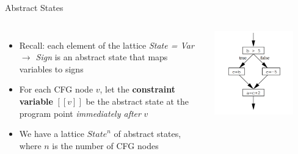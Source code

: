 \documentclass[aspectratio=169,xcolor=dvipsnames]{beamer}
\begin{document}

\begin{frame}[fragile]{Abstract States}
	\begin{columns}[c] %


		\begin{itemize}
			\item Recall: each element of the lattice {\it State = Var $\rightarrow$ Sign} is an
			      abstract state that maps variables to signs
			\item For each CFG node $v$, let the {\bf constraint variable} $[[v]]$ be the abstract state at the program point {\it
					      immediately after} $v$
			\item We have a lattice $\textit{State}^{n}$ of abstract states, where $n$ is the
			      number of CFG nodes
		\end{itemize}

		\includegraphics[width=0.8\textwidth]{img/2.png}
	\end{columns}
\end{frame}

\end{document}
